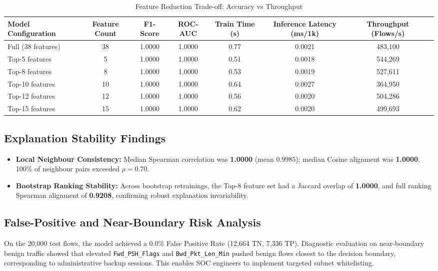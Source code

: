 \documentclass[conference]{IEEEtran}
\begin{document}
\begin{table}[t]
\caption{Feature Reduction Trade-off: Accuracy vs Throughput}
\label{tab:feature_reduction}
\centering
\begin{tabular}{lccccccr}
\toprule
\textbf{Model Configuration} & \textbf{Feature Count} & \textbf{F1-Score} & \textbf{ROC-AUC} & \textbf{Train Time (s)} & \textbf{Inference Latency (ms/1k)} & \textbf{Throughput (Flows/s)} \\
\midrule
Full (38 features) & 38 & 1.0000 & 1.0000 & 0.77 & 0.0021 & 483,100 \\
Top-5 features & 5 & 1.0000 & 1.0000 & 0.51 & 0.0018 & 544,269 \\
Top-8 features & 8 & 1.0000 & 1.0000 & 0.53 & 0.0019 & 527,611 \\
Top-10 features & 10 & 1.0000 & 1.0000 & 0.64 & 0.0027 & 364,950 \\
Top-12 features & 12 & 1.0000 & 1.0000 & 0.56 & 0.0020 & 504,286 \\
Top-15 features & 15 & 1.0000 & 1.0000 & 0.62 & 0.0020 & 499,693 \\
\bottomrule
\end{tabular}
\end{table}

\subsection{Explanation Stability Findings}
\begin{itemize}
    \item \textbf{Local Neighbour Consistency:} Median Spearman correlation was \textbf{1.0000} (mean $0.9985$); median Cosine alignment was \textbf{1.0000}. 100\% of neighbour pairs exceeded $\rho = 0.70$.
    \item \textbf{Bootstrap Ranking Stability:} Across bootstrap retrainings, the Top-8 feature set had a Jaccard overlap of \textbf{1.0000}, and full ranking Spearman alignment of \textbf{0.9208}, confirming robust explanation invariability.
\end{itemize}

\subsection{False-Positive and Near-Boundary Risk Analysis}
On the 20,000 test flows, the model achieved a 0.0\% False Positive Rate (12,664 TN, 7,336 TP). Diagnostic evaluation on near-boundary benign traffic showed that elevated \texttt{Fwd\_PSH\_Flags} and \texttt{Bwd\_Pkt\_Len\_Min} pushed benign flows closest to the decision boundary, corresponding to administrative backup sessions. This enables SOC engineers to implement targeted subnet whitelisting.
\end{document}
